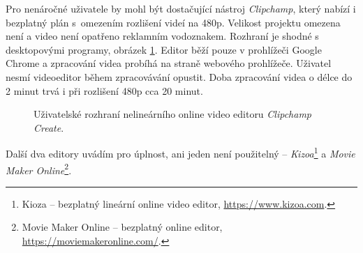 Pro nenáročné uživatele by mohl být dostačující nástroj \textit{Clipchamp}, který nabízí i bezplatný plán s~omezením rozlišení videí na 480p. Velikost projektu omezena není a video není opatřeno reklamním vodoznakem. Rozhraní je shodné s desktopovými programy, obrázek \ref{img:clipchamp}. Editor běží pouze v prohlížeči Google Chrome a zpracování videa probíhá na straně webového prohlížeče. Uživatel nesmí videoeditor během zpracovávání opustit. Doba zpracování videa o délce do 2 minut trvá i při rozlišení 480p cca 20 minut.
\begin{figure}[h]
	\centering
	\caption{Uživatelské rozhraní nelineárního online video editoru \textit{Clipchamp Create}.}\label{img:clipchamp}
\end{figure}

Další dva editory uvádím pro úplnost, ani jeden není použitelný -- \textit{Kizoa}\footnote{Kioza -- bezplatný lineární online video editor, \url{https://www.kizoa.com}.} a \textit{Movie Maker Online}\footnote{Movie Maker Online -- bezplatný online editor, \url{https://moviemakeronline.com/}.}.

